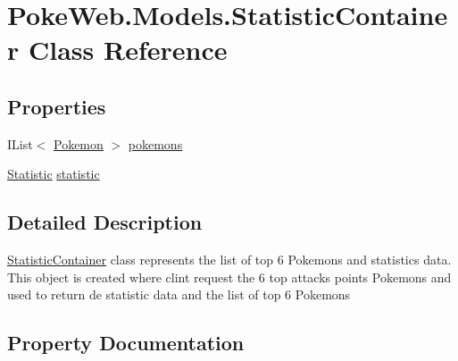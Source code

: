 \hypertarget{class_poke_web_1_1_models_1_1_statistic_container}{}\section{Poke\+Web.\+Models.\+Statistic\+Container Class Reference}
\label{class_poke_web_1_1_models_1_1_statistic_container}
\subsection*{Properties}
\begin{DoxyCompactItemize}
\item 
I\+List$<$ \mbox{\hyperlink{class_poke_web_1_1_models_1_1_pokemon}{Pokemon}} $>$ \mbox{\hyperlink{class_poke_web_1_1_models_1_1_statistic_container_a6604be3f919e9d1f389f78f844438c54}{pokemons}}
\item 
\mbox{\hyperlink{class_poke_web_1_1_models_1_1_statistic}{Statistic}} \mbox{\hyperlink{class_poke_web_1_1_models_1_1_statistic_container_a4d3cb3c4061cd7077870bcd1675aaff6}{statistic}}
\end{DoxyCompactItemize}


\subsection{Detailed Description}
\mbox{\hyperlink{class_poke_web_1_1_models_1_1_statistic_container}{Statistic\+Container}} class represents the list of top 6 Pokemons and statistics data. This object is created where clint request the 6 top attacks points Pokemons and used to return de statistic data and the list of top 6 Pokemons 

\subsection{Property Documentation}
\mbox{\label{class_poke_web_1_1_models_1_1_statistic_container_a6604be3f919e9d1f389f78f844438c54}} 
